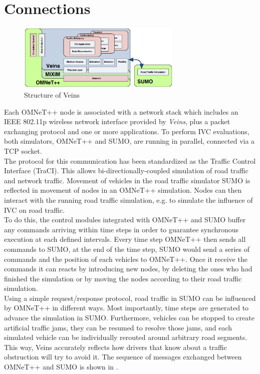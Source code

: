 \section{Connections}
\label{sec:Omnetpp}
\begin{figure}[H]
    \centering
    \includegraphics[width=0.7\textwidth]{fig/veins-arch.png}
    \caption{Structure of Veins}
\end{figure}
Each OMNeT++ node is associated with a network stack which includes an IEEE 802.11p wireless network interface provided by \emph{Veins}, plus a packet exchanging protocol and one or more applications.
To perform IVC evaluations, both simulators, OMNeT++ and SUMO, are running in parallel, connected via a TCP socket. \\The protocol for this communication has been standardized as the Traffic Control Interface (TraCI). This allows bi-directionally-coupled simulation of road traffic and network traffic. Movement of vehicles in the road traffic simulator SUMO is reflected in movement of nodes in an OMNeT++ simulation. Nodes can then interact with the running road traffic simulation, e.g. to simulate the influence of IVC on road traffic.\\
To do this, the control modules integrated with OMNeT++ and SUMO buffer any commands arriving within time steps in order to guarantee synchronous execution at each defined intervals. Every time step OMNeT++ then sends all commands to SUMO, at the end of the time step, SUMO would send a series of commands and the position of each vehicles to OMNeT++. Once it receive the commands it can reacts by introducing new nodes, by deleting the ones who had finished the simulation or by moving the nodes according to their road traffic simulation.\\
Using a simple request/response protocol, road traffic in SUMO can be influenced by OMNeT++ in different ways. Most importantly, time steps are generated to advance the simulation in SUMO. Furthermore, vehicles can be stopped to create artificial traffic jams, they can be resumed to
 resolve those jams, and each simulated vehicle can be individually rerouted around arbitrary road segments. This way, Veins accurately reflects how drivers that know about a traffic obstruction will try to avoid it. The sequence of messages exchanged between OMNeT++ and SUMO is shown in .
